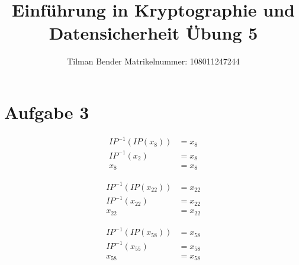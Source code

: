\documentclass[10pt,a4paper]{article}
\author{Tilman Bender   Matrikelnummer: 108011247244\\}
\title{Einführung in Kryptographie und Datensicherheit Übung 5}
\begin{document}
\maketitle

\section*{Aufgabe 3}
\begin{align*} 
IP^{-1}(IP(x_{8}))&=x_{8}\\
IP^{-1}(x_{2}) &= x_{8}\\
x_{8} &= x_{8}
\end{align*}

\begin{align*} 
IP^{-1}(IP(x_{22}))&=x_{22}\\
IP^{-1}(x_{22}) &= x_{22}\\
x_{22} &= x_{22}
\end{align*}

\begin{align*} 
IP^{-1}(IP(x_{58}))&=x_{58}\\
IP^{-1}(x_{55}) &= x_{58}\\
x_{58} &= x_{58}
\end{align*}
\end{document}
